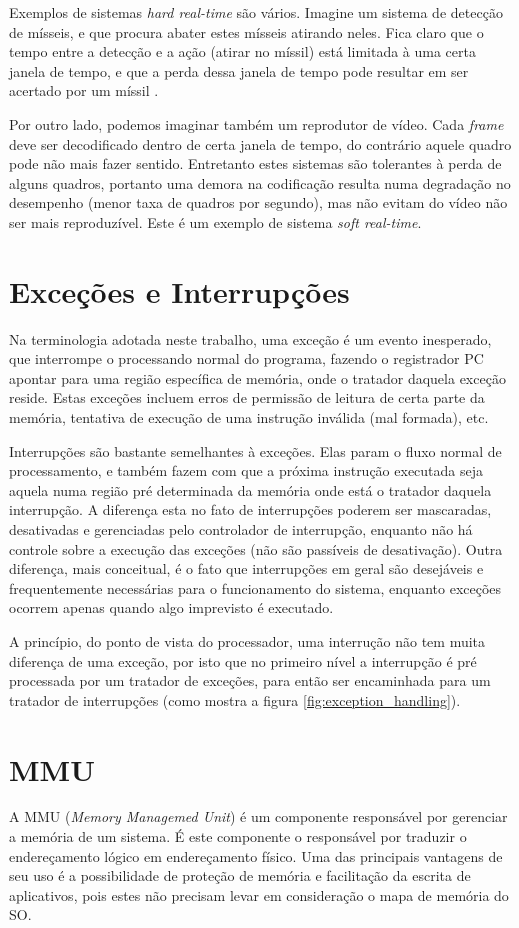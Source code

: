 Exemplos de sistemas \emph{hard real-time} são vários. Imagine um sistema de detecção de mísseis, e que procura abater estes mísseis atirando neles. Fica claro que o tempo entre a detecção e a ação (atirar no míssil) está limitada à uma certa janela de tempo, e que a perda dessa janela de tempo pode resultar em ser acertado por um míssil \cite{realtime}.

Por outro lado, podemos imaginar também um reprodutor de vídeo. Cada \emph{frame} deve ser decodificado dentro de certa janela de tempo, do contrário aquele quadro pode não mais fazer sentido. Entretanto estes sistemas são tolerantes à perda de alguns quadros, portanto uma demora na codificação resulta numa degradação no desempenho (menor taxa de quadros por segundo), mas não evitam do vídeo não ser mais reproduzível. Este é um exemplo de sistema \emph{soft real-time}.

\section{Exceções e Interrupções}
Na terminologia adotada neste trabalho, uma exceção é um evento inesperado, que interrompe o processando normal do programa, fazendo o registrador PC apontar para uma região específica de memória, onde o tratador daquela exceção reside. Estas exceções incluem erros de permissão de leitura de certa parte da memória, tentativa de execução de uma instrução inválida (mal formada), etc.

Interrupções são bastante semelhantes à exceções. Elas param o fluxo normal de processamento, e também fazem com que a próxima instrução executada seja aquela numa região pré determinada da memória onde está o tratador daquela interrupção. A diferença esta no fato de interrupções poderem ser mascaradas, desativadas e gerenciadas pelo controlador de interrupção, enquanto não há controle sobre a execução das exceções (não são passíveis de desativação). Outra diferença, mais conceitual, é o fato que interrupções em geral são desejáveis e frequentemente necessárias para o funcionamento do sistema, enquanto exceções ocorrem apenas quando algo imprevisto é executado.

A princípio, do ponto de vista do processador, uma interrução não tem muita diferença de uma exceção, por isto que no primeiro nível a interrupção é pré processada por um tratador de exceções, para então ser encaminhada para um tratador de interrupções (como mostra a figura \ref{fig:exception_handling}).


\section{MMU} %
A MMU (\emph{Memory Managemed Unit}) é um componente responsável por gerenciar a memória de um sistema. É este componente o responsável por traduzir o endereçamento lógico em endereçamento físico. Uma das principais vantagens de seu uso é a possibilidade de proteção de memória e facilitação da escrita de aplicativos, pois estes não precisam levar em consideração o mapa de memória do SO.

